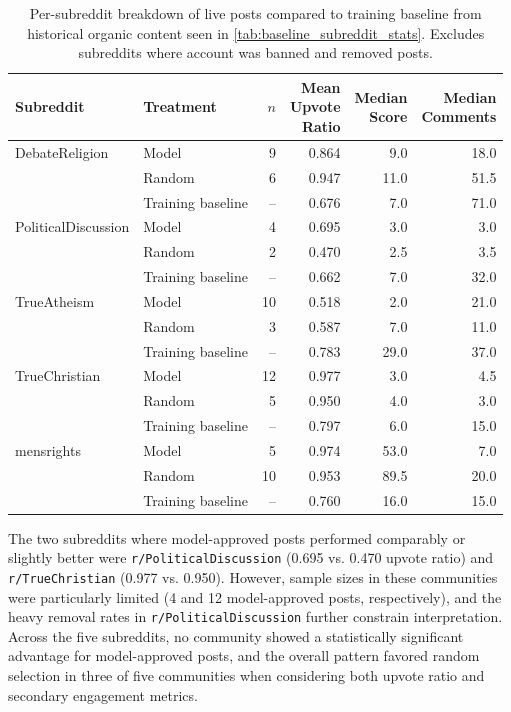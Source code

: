 \begin{table}[htbp]
\centering
\caption{Per-subreddit breakdown of live posts compared to training baseline from historical organic content seen in \autoref{tab:baseline_subreddit_stats}. Excludes subreddits where account was banned and removed posts.}
\label{tab:subreddit_breakdown}
\begin{tabular}{llrrrr}
\toprule
Subreddit & Treatment & $n$ & \makecell{Mean\\Upvote\\Ratio} & \makecell{Median\\Score} & \makecell{Median\\Comments} \\
\midrule
DebateReligion & Model & 9 & 0.864 & 9.0 & 18.0 \\
 & Random & 6 & 0.947 & 11.0 & 51.5 \\
 & Training baseline & -- & 0.676 & 7.0 & 71.0 \\
\midrule
PoliticalDiscussion & Model & 4 & 0.695 & 3.0 & 3.0 \\
 & Random & 2 & 0.470 & 2.5 & 3.5 \\
 & Training baseline & -- & 0.662 & 7.0 & 32.0 \\
\midrule
TrueAtheism & Model & 10 & 0.518 & 2.0 & 21.0 \\
 & Random & 3 & 0.587 & 7.0 & 11.0 \\
 & Training baseline & -- & 0.783 & 29.0 & 37.0 \\
\midrule
TrueChristian & Model & 12 & 0.977 & 3.0 & 4.5 \\
 & Random & 5 & 0.950 & 4.0 & 3.0 \\
 & Training baseline & -- & 0.797 & 6.0 & 15.0 \\
\midrule
mensrights & Model & 5 & 0.974 & 53.0 & 7.0 \\
 & Random & 10 & 0.953 & 89.5 & 20.0 \\
 & Training baseline & -- & 0.760 & 16.0 & 15.0 \\
\bottomrule
\end{tabular}
\vspace{0.2cm}
\end{table}

The two subreddits where model-approved posts performed comparably or slightly better were \verb!r/PoliticalDiscussion! (0.695 vs. 0.470 upvote ratio) and \verb!r/TrueChristian! (0.977 vs. 0.950). However, sample sizes in these communities were particularly limited (4 and 12 model-approved posts, respectively), and the heavy removal rates in \verb!r/PoliticalDiscussion! further constrain interpretation. Across the five subreddits, no community showed a statistically significant advantage for model-approved posts, and the overall pattern favored random selection in three of five communities when considering both upvote ratio and secondary engagement metrics.

